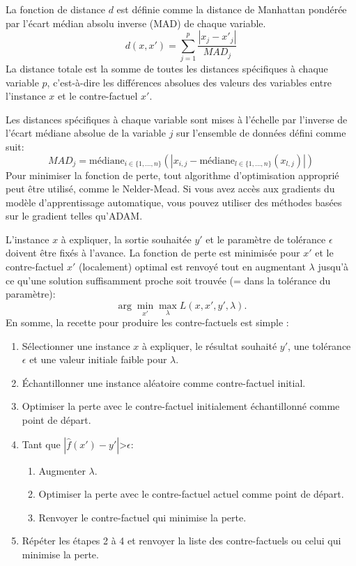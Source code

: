 La fonction de distance \(d\) est définie comme la distance de Manhattan pondérée par l'écart médian absolu inverse (MAD) de chaque variable.
\[
d(x,x')=\sum_{j=1}^p\frac{|x_j-x'_j|}{MAD_j}
\]
La distance totale est la somme de toutes les distances spécifiques à chaque variable \(p\), c'est-à-dire les différences absolues des valeurs des variables entre l'instance \(x\) et le contre-factuel \(x'\).

Les distances spécifiques à chaque variable sont mises à l'échelle par l'inverse de l'écart médiane absolue de la variable \(j\) sur l'ensemble de données défini comme suit:
\[
MAD_j=\text{médiane}_{i\in\{1,\ldots,n\}}(|x_{i,j}-\text{médiane}_{l\in\{1,\ldots,n\}}(x_{l,j})|)
\]
Pour minimiser la fonction de perte, tout algorithme d'optimisation approprié peut être utilisé, comme le Nelder-Mead. Si vous avez accès aux gradients du modèle d'apprentissage automatique, vous pouvez utiliser des méthodes basées sur le gradient telles qu'ADAM.

L'instance \(x\) à expliquer, la sortie souhaitée \(y'\) et le paramètre de tolérance \(\epsilon\) doivent être fixés à l'avance. La fonction de perte est minimisée pour \(x'\) et le contre-factuel \(x'\) (localement) optimal est renvoyé tout en augmentant \(\lambda\) jusqu'à ce qu'une solution suffisamment proche soit trouvée (= dans la tolérance du paramètre):
\[
\arg\min_{x'}\max_{\lambda}L(x,x',y',\lambda).
\]
En somme, la recette pour produire les contre-factuels est simple :
\begin{enumerate}
    \item Sélectionner une instance \(x\) à expliquer, le résultat souhaité \(y'\), une tolérance \(\epsilon\) et une valeur initiale faible pour \(\lambda\).
    \item Échantillonner une instance aléatoire comme contre-factuel initial.
    \item Optimiser la perte avec le contre-factuel initialement échantillonné comme point de départ.
    \item Tant que \(|\hat{f}(x')-y'|\)>\(\epsilon\):
    \begin{enumerate}
        \item Augmenter \(\lambda\).
        \item Optimiser la perte avec le contre-factuel actuel comme point de départ.
        \item Renvoyer le contre-factuel qui minimise la perte.
    \end{enumerate}
    \item Répéter les étapes 2 à 4 et renvoyer la liste des contre-factuels ou celui qui minimise la perte.
\end{enumerate}

